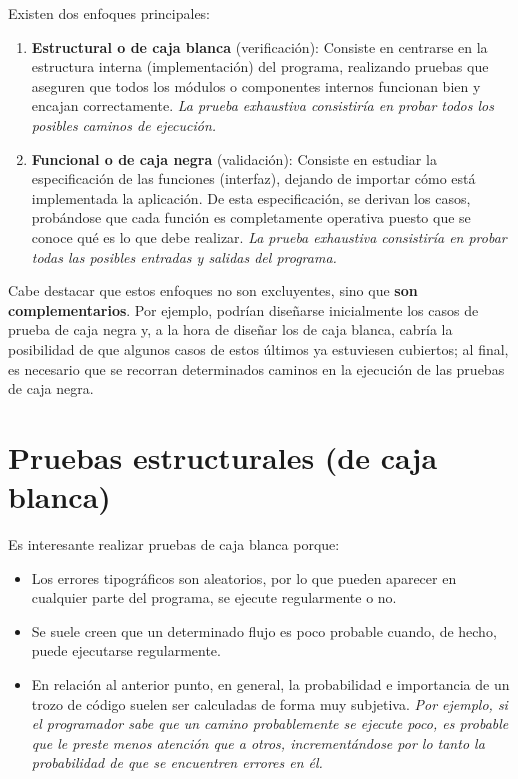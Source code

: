 Existen dos enfoques principales:

\begin{enumerate}
    \item \textbf{Estructural o de caja blanca} (verificación): Consiste en centrarse en la estructura interna (implementación) del programa, realizando pruebas que aseguren que todos los módulos o componentes internos funcionan bien y encajan correctamente. \textit{La prueba exhaustiva consistiría en probar todos los posibles caminos de ejecución.}
    \item \textbf{Funcional o de caja negra} (validación): Consiste en estudiar la especificación de las funciones (interfaz), dejando de importar cómo está implementada la aplicación. De esta especificación, se derivan los casos, probándose que cada función es completamente operativa puesto que se conoce qué es lo que debe realizar. \textit{La prueba exhaustiva consistiría en probar todas las posibles entradas y salidas del programa.}
\end{enumerate}

Cabe destacar que estos enfoques no son excluyentes, sino que \textbf{son complementarios}. Por ejemplo, podrían diseñarse inicialmente los casos de prueba de caja negra y, a la hora de diseñar los de caja blanca, cabría la posibilidad de que algunos casos de estos últimos ya estuviesen cubiertos; al final, es necesario que se recorran determinados caminos en la ejecución de las pruebas de caja negra.


\section{Pruebas estructurales (de caja blanca)}

Es interesante realizar pruebas de caja blanca porque:

\begin{itemize}
    \item Los errores tipográficos son aleatorios, por lo que pueden aparecer en cualquier parte del programa, se ejecute regularmente o no.
    \item Se suele creen que un determinado flujo es poco probable cuando, de hecho, puede ejecutarse regularmente.
    \item En relación al anterior punto, en general, la probabilidad e importancia de un trozo de código suelen ser calculadas de forma muy subjetiva. \textit{Por ejemplo, si el programador sabe que un camino probablemente se ejecute poco, es probable que le preste menos atención que a otros, incrementándose por lo tanto la probabilidad de que se encuentren errores en él.}
\end{itemize}

